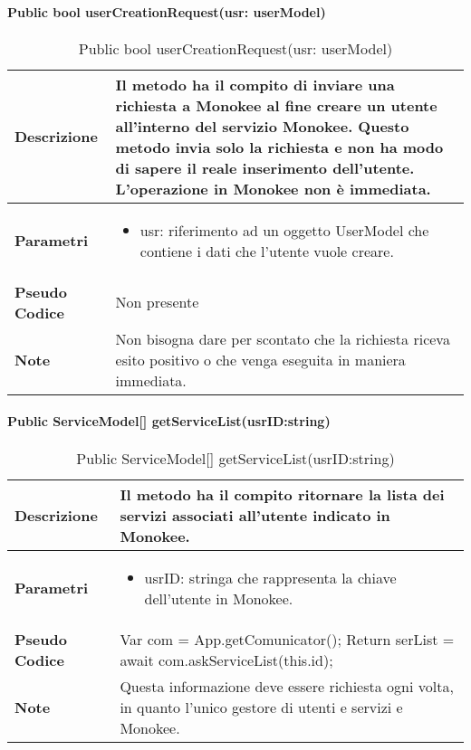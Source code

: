 \paragraph{Public bool userCreationRequest(usr: userModel)}
\begin{center}
    \begin{longtable}{|p{3cm}|p{9cm}|}%
    \caption{Public bool userCreationRequest(usr: userModel)}
    \label{tab:public-bool-userCreationRequest}
    \endfirsthead
    \endhead
    \hline
    \textbf{Descrizione} & Il metodo ha il compito di inviare una richiesta a Monokee al fine creare un utente all’interno del servizio Monokee. Questo metodo invia solo la richiesta e non ha modo di sapere il reale inserimento dell’utente. L’operazione in Monokee non è immediata.\\
    \hline
    \textbf{Parametri} &      
        \begin{itemize}
            \item usr: riferimento ad un oggetto UserModel che contiene i dati che l'utente vuole creare.
        \end{itemize}
    \\
    \hline
    \textbf{Pseudo Codice} & Non presente \\
    \hline
    \textbf{Note} & Non bisogna dare per scontato che la richiesta riceva esito positivo o che venga eseguita in maniera immediata. \\
    \hline
    \end{longtable}
    \end{center}



\paragraph{Public ServiceModel[] getServiceList(usrID:string)}
\begin{center}
    \begin{longtable}{|p{3cm}|p{9cm}|}%
    \caption{Public ServiceModel[] getServiceList(usrID:string)}
    \label{tab:public-ServiceModel[]-getServiceList}
    \endfirsthead
    \endhead
    \hline
    \textbf{Descrizione} & Il metodo ha il compito ritornare la lista dei servizi associati all’utente indicato in Monokee.  \\
    \hline
    \textbf{Parametri} &      
        \begin{itemize}
            \item usrID: stringa che rappresenta la chiave dell’utente in Monokee.
        \end{itemize}
    \\
    \hline
    \textbf{Pseudo Codice} & 
            Var com = App.getComunicator();\newline
            Return serList = await com.askServiceList(this.id);
    \\
    \hline
    \textbf{Note} & Questa informazione deve essere richiesta ogni volta, in quanto l’unico gestore di utenti e servizi e Monokee. \\
    \hline
    \end{longtable}
    \end{center}

